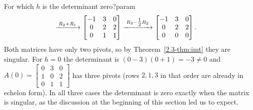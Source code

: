 \documentclass[11pt]{article}
\begin{document}
\begin{exmp}{For which $h$ is the determinant zero?}{param}
\begin{align*}
&\xrightarrow{\;R_2+R_1\;}
\begin{bmatrix}-1&3&0\\0&2&2\\0&1&1\end{bmatrix}
\xrightarrow{\;R_3-\tfrac12R_2\;}
\begin{bmatrix}-1&3&0\\0&2&2\\0&0&0\end{bmatrix}.
\end{align*}
Both matrices have only two pivots, so by Theorem~\ref{2.3-thm:imt} they are singular. For $h=0$ the determinant is $(0-3)(0+1)=-3\neq0$ and $A(0)=\begin{bmatrix}0&3&0\\1&0&2\\0&1&1\end{bmatrix}$ has three pivots (rows $2,1,3$ in that order are already in echelon form). In all three cases the determinant is zero exactly when the matrix is singular, as the discussion at the beginning of this section led us to expect.
\end{exmp}
\end{document}
